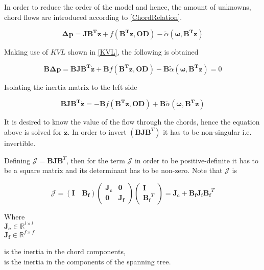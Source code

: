 In order to reduce the order of the model and hence, the amount of unknowns, chord flows are introduced according to \eqref{ChordRelation}. 

\begin{equation}
    \bm{\Delta p} =  \bm{J} \bm{B^T} \bm{\dot{z}} + f(\bm{B^T}\bm{z}, \bm{OD}) - \tilde{\alpha} (\bm{\omega},\bm{B^T}\bm{z})
  \label{ChordsModel}
\end{equation}

Making use of $KVL$ shown in \eqref{KVL}, the following is obtained

\begin{equation}
 \bm{B}\bm{\Delta p} = \bm{B} \bm{J} \bm{B^T} \bm{\dot{z}} + \bm{B} f(\bm{B^T}\bm{z}, \bm{OD}) - \bm{B}\tilde{\alpha} (\bm{\omega},\bm{B^T}\bm{z}) = 0 \label{model4lin}
 \end{equation}

Isolating the inertia matrix to the left side

\begin{equation}
  \bm{B} \bm{J} \bm{B^T} \bm{\dot{z}} = - \bm{B} f(\bm{B^T}\bm{z},\bm{OD}) + \bm{B}\tilde{\alpha} (\bm{\omega},\bm{B^T}\bm{z}) 
 \label{isolateZ}
 \end{equation}

It is desired to know the value of the flow through the chords, hence the equation above is solved 
for $\bm{\dot{z}}$. In order to invert $(\bm{B J} \bm{{B}}^T)$ it has to be non-singular i.e. invertible. 

Defining $\bm{\mathcal{J}} = \bm{B J} \bm{{B}}^T $, then for the term $\bm{\mathcal{J}}$ in order to be positive-definite it has to be a square matrix and its determinant has to be non-zero. Note that $\bm{\mathcal{J}}$ is

\begin{equation}
  \label{Jequation}
  \bm{\mathcal{J}} = (\bm{I \quad B_f}) 
  \begin{pmatrix}
    \bm{J_c}    &    \bm{0 }   \\
    \bm{0}       &   \bm{ J_f}
  \end{pmatrix}
  \begin{pmatrix}
    \bm{I}    \\
    \bm{{B_f}}^T
  \end{pmatrix}
  = \bm{J_c} + \bm{B_f J_f} \bm{{B_f}}^T
\end{equation}

\begin{minipage}[t]{0.20\textwidth}
Where\\
\hspace*{8mm} $\bm{J_c} \in \mathbb{R}^{l \times l}$  \\
\hspace*{8mm} $\bm{J_f} \in \mathbb{R}^{f \times f} $ 
\end{minipage}
\begin{minipage}[t]{0.68\textwidth}
\vspace*{2mm}
\hspace*{4mm} is the inertia in the chord components,\\
\hspace*{4mm} is the inertia in the components of the spanning tree.
\end{minipage}

